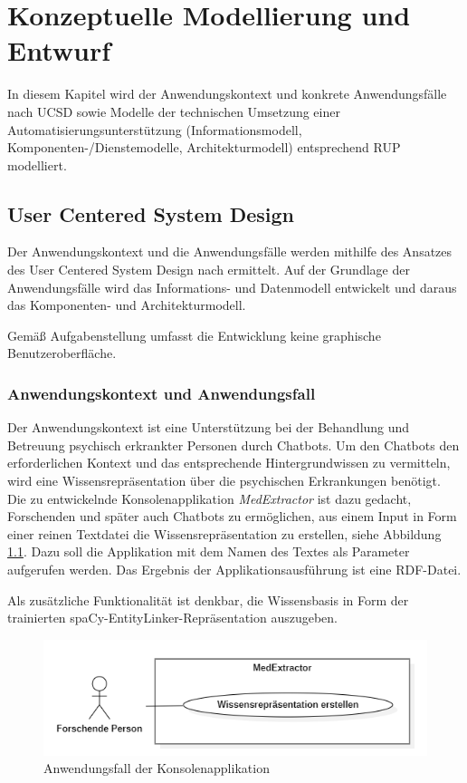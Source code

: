 \chapter{Konzeptuelle Modellierung und Entwurf}
\label{ch:modellierung}
In diesem Kapitel wird der Anwendungskontext und konkrete Anwendungsfälle nach UCSD sowie Modelle der technischen Umsetzung einer Automatisierungsunterstützung (Informationsmodell, Komponenten-/Dienstemodelle, Architekturmodell) entsprechend RUP modelliert.

\section{User Centered System Design }

Der Anwendungskontext und die Anwendungsfälle werden mithilfe des Ansatzes des User Centered System Design nach \cite{norman1986user} ermittelt. Auf der Grundlage der Anwendungsfälle wird das Informations- und Datenmodell entwickelt und daraus das Komponenten- und Architekturmodell.


Gemäß Aufgabenstellung umfasst die Entwicklung keine graphische Benutzeroberfläche.

\subsection{Anwendungskontext und Anwendungsfall}

Der Anwendungskontext ist eine Unterstützung bei der Behandlung und Betreuung psychisch erkrankter Personen durch Chatbots. Um den Chatbots den erforderlichen Kontext und das entsprechende Hintergrundwissen zu vermitteln, wird eine Wissensrepräsentation über die psychischen Erkrankungen benötigt. Die zu entwickelnde Konsolenapplikation \emph{MedExtractor} ist dazu gedacht, Forschenden und später auch Chatbots zu ermöglichen, aus einem Input in Form einer reinen Textdatei die Wissensrepräsentation zu erstellen, siehe Abbildung \ref{fig:anwendungsfaelle}. Dazu soll die Applikation mit dem Namen des Textes als Parameter aufgerufen werden. Das Ergebnis der Applikationsausführung ist eine RDF-Datei. 

Als zusätzliche Funktionalität ist denkbar, die Wissensbasis in Form der trainierten spaCy-EntityLinker-Repräsentation auszugeben.

\begin{figure}
    \centering
    \includegraphics[width=\textwidth]{pictures/UseCases.png}
    \caption{Anwendungsfall der Konsolenapplikation}
    \label{fig:anwendungsfaelle}
\end{figure}

